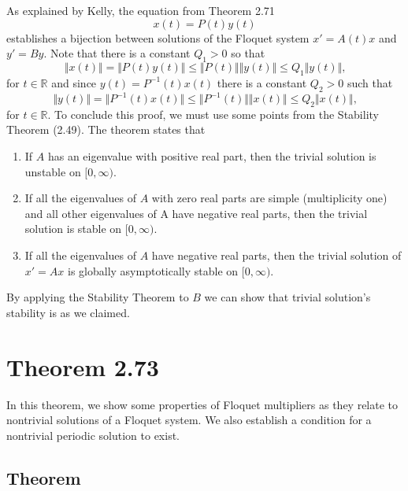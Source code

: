 \documentclass[a4paper]{article}
\begin{document}
As explained by Kelly, the equation from Theorem 2.71 
\begin{equation*}
    x(t) = P(t)y(t)
\end{equation*}
establishes a bijection between solutions of the Floquet system $x' = A(t)x$ and $y' = By$. Note that there is a constant $Q_1 > 0$ so that 
\begin{equation*}
    \Vert x(t) \Vert = \Vert P(t)y(t) \Vert \leq \Vert P(t) \Vert \Vert y(t) \Vert  \leq Q_{1} \Vert y(t) \Vert \text{,}
\end{equation*}
for $t \in \mathbb{R}$ and since $y(t) = P^{-1}(t)x(t)$ there is a constant $Q_2 > 0$ such that 
\begin{equation*}
    \Vert y(t) \Vert = \Vert P^{-1}(t)x(t) \Vert \leq \Vert P^{-1}(t) \Vert \Vert x(t) \Vert  \leq Q_{2} \Vert x(t) \Vert \text{,}
\end{equation*}
for $t \in \mathbb{R}$. To conclude this proof, we must use some points from the Stability Theorem (2.49). The theorem states that \begin{enumerate}
    \item If $A$ has an eigenvalue with positive real part, then the trivial solution is unstable on $[0,\infty)$.
    \item If all the eigenvalues of $A$ with zero real parts are simple (multiplicity one) and all other eigenvalues of A have negative real parts, then the trivial solution is stable on $[0,\infty)$.
    \item If all the eigenvalues of $A$ have negative real parts, then the trivial solution of $x' = Ax$ is globally asymptotically stable on $[0,\infty)$.
\end{enumerate}

By applying the Stability Theorem to $B$ we can show that trivial solution's stability is as we claimed.

\section{Theorem 2.73}

In this theorem, we show some properties of Floquet multipliers as they relate to nontrivial solutions of a Floquet system. We also establish a condition for a nontrivial periodic solution to exist.

\subsection{Theorem}
\end{document}
